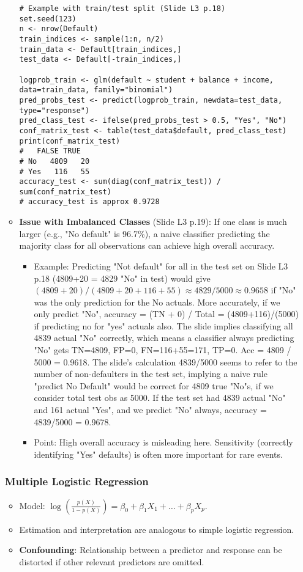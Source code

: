 \documentclass[12pt,a4paper]{article}
\begin{document}
\begin{itemize}
\begin{itemize}
\begin{lstlisting}[caption={Logistic Regression and Confusion Matrix (Slides L3 p.17-18)}]
# Example with train/test split (Slide L3 p.18)
set.seed(123)
n <- nrow(Default)
train_indices <- sample(1:n, n/2)
train_data <- Default[train_indices,]
test_data <- Default[-train_indices,]

logprob_train <- glm(default ~ student + balance + income, data=train_data, family="binomial")
pred_probs_test <- predict(logprob_train, newdata=test_data, type="response")
pred_class_test <- ifelse(pred_probs_test > 0.5, "Yes", "No")
conf_matrix_test <- table(test_data$default, pred_class_test)
print(conf_matrix_test)
#   FALSE TRUE
# No   4809   20
# Yes   116   55
accuracy_test <- sum(diag(conf_matrix_test)) / sum(conf_matrix_test)
# accuracy_test is approx 0.9728
\end{lstlisting}
            \item \textbf{Issue with Imbalanced Classes} (Slide L3 p.19): If one class is much larger (e.g., "No default" is 96.7\%), a naive classifier predicting the majority class for all observations can achieve high overall accuracy.
                \begin{itemize}
                    \item Example: Predicting "Not default" for all in the test set on Slide L3 p.18 (4809+20 = 4829 "No" in test) would give $(4809+20)/(4809+20+116+55) \approx 4829/5000 \approx 0.9658$ if "No" was the only prediction for the No actuals. More accurately, if we only predict "No", accuracy = (TN + 0) / Total = (4809+116)/(5000) if predicting no for "yes" actuals also. The slide implies classifying all 4839 actual "No" correctly, which means a classifier always predicting "No" gets TN=4809, FP=0, FN=116+55=171, TP=0. Acc = 4809 / 5000 = 0.9618. The slide's calculation 4839/5000 seems to refer to the number of non-defaulters in the test set, implying a naive rule "predict No Default" would be correct for 4809 true "No"s, if we consider total test obs as 5000. If the test set had 4839 actual "No" and 161 actual "Yes", and we predict "No" always, accuracy = 4839/5000 = 0.9678.
                    \item Point: High overall accuracy is misleading here. Sensitivity (correctly identifying "Yes" defaults) is often more important for rare events.
                \end{itemize}
        \end{itemize}

    \subsubsection{Multiple Logistic Regression }
        \begin{itemize}
            \item Model: $\log\left(\frac{p(X)}{1-p(X)}\right) = \beta_0 + \beta_1 X_1 + \dots + \beta_p X_p$.
            \item Estimation and interpretation are analogous to simple logistic regression.
            \item \textbf{Confounding}: Relationship between a predictor and response can be distorted if other relevant predictors are omitted.
        \end{itemize}

\end{itemize}
\end{document}
